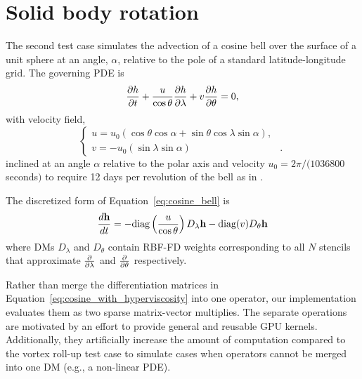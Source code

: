 \documentclass{report}
\begin{document}

\section{Solid body rotation}

The second test case simulates the advection of a cosine bell over the surface of a unit sphere at an angle, $\alpha$, relative to the pole of a standard latitude-longitude grid. The governing PDE is
\begin{equation}
\frac{\partial h}{\partial t} + \frac{u}{\cos \theta} \frac{\partial h}{\partial \lambda} + v \frac{\partial h}{\partial \theta} = 0, \label{eq:cosine_bell}
\end{equation}
with velocity field,
\begin{equation*}
\begin{cases}
u =  u_0 (\cos \theta \cos \alpha + \sin \theta \cos \lambda \sin \alpha),  & \\
v =  -u_0(\sin \lambda \sin \alpha) &.
\end{cases}
\end{equation*}
inclined at an angle $\alpha$ relative to the polar axis and velocity $u_0 = 2 \pi / (1036800$ seconds$)$ to require 12 days per revolution of the bell as in \cite{NairTransport05, FlyerWright07}.

The discretized form of Equation~\ref{eq:cosine_bell} is
\begin{equation}
\frac{d \mathbf{h}}{d t} = -\text{diag}\left(\frac{u}{\cos \theta}\right) D_\lambda \mathbf{h} - \text{diag}(v) D_\theta \mathbf{h}
\label{eq:cosine_with_hyperviscosity}
\end{equation}
where DMs $D_\lambda$ and $D_\theta$ contain RBF-FD weights corresponding to all $N$ stencils that approximate $\frac{\partial }{\partial \lambda}$ and $\frac{\partial }{\partial \theta}$ respectively. 

Rather than merge the differentiation matrices in Equation~\ref{eq:cosine_with_hyperviscosity} into one operator, our implementation evaluates them as two sparse matrix-vector multiplies. The separate operations are motivated by an effort to provide general and reusable GPU kernels. Additionally, they artificially increase the amount of computation compared to the vortex roll-up test case to simulate cases when operators cannot be merged into one DM (e.g., a non-linear PDE).
\end{document}
